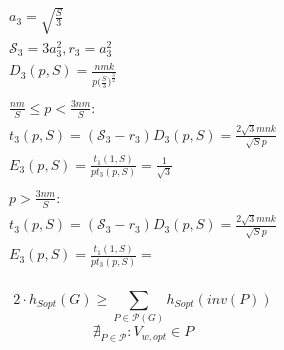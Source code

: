 \documentclass[sigplan,review,anonymous]{acmart}\settopmatter{printfolios=true,printccs=false,printacmref=false}
\begin{document}
\begin{multline}
\\
a_3 = \sqrt{\frac{S}{3}} \\ 
\mathcal{S}_3 = 3a_3^2, r_3 = a_3^2\\ 
D_3(p,S) = \frac{nmk}{p \Big(\frac{S}{3}\Big)^{\frac{3}{2}}}\\
\\
\frac{nm}{S} \le p < \frac{3nm}{S} :\\
t_3(p,S) = (\mathcal{S}_3 - r_3) D_3(p,S) = \frac{2\sqrt{3}mnk}{\sqrt{S}p} \\
E_3(p,S) = \frac{t_1(1,S)}{p t_3(p,S)} = \frac{1}{\sqrt{3}}\\
\\
p > \frac{3nm}{S} :\\
t_3(p,S) = (\mathcal{S}_3 - r_3) D_3(p,S) = \frac{2\sqrt{3}mnk}{\sqrt{S}p} \\
E_3(p,S) = \frac{t_1(1,S)}{p t_3(p,S)} = \\
\end{multline}

$$2 \cdot h_{Sopt}(G) \ge \sum_{P \in \mathcal{P}(G)} h_{Sopt}(inv(P)) $$
$$ \nexists_{P \in \mathcal{P}}: V_{w,opt} \in P $$

\end{document}
